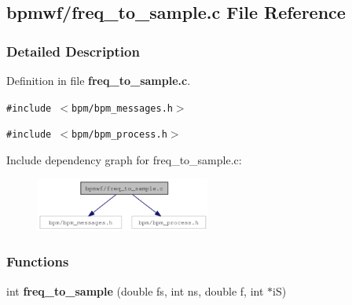 \subsection{bpmwf/freq\_\-to\_\-sample.c File Reference}
\label{freq__to__sample_8c}


\subsubsection{Detailed Description}


Definition in file {\bf freq\_\-to\_\-sample.c}.

{\tt \#include $<$bpm/bpm\_\-messages.h$>$}\par
{\tt \#include $<$bpm/bpm\_\-process.h$>$}\par


Include dependency graph for freq\_\-to\_\-sample.c:\nopagebreak
\begin{figure}[H]
\begin{center}
\leavevmode
\includegraphics[width=162pt]{freq__to__sample_8c__incl}
\end{center}
\end{figure}
\subsubsection*{Functions}
\begin{CompactItemize}
\item 
int \textbf{freq\_\-to\_\-sample} (double fs, int ns, double f, int $\ast$iS)\label{group__wave_g6f575cd6ad7e547c4d55f530a003337a}

\end{CompactItemize}
